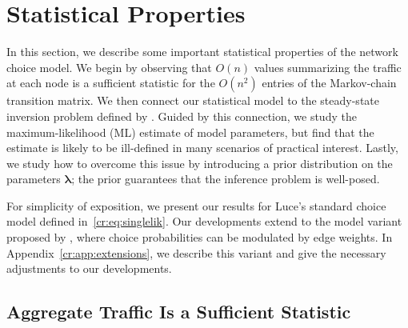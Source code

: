 \section{Statistical Properties}  %
\label{cr:sec:theory}

In this section, we describe some important statistical properties of the network choice model.
We begin by observing that $O(n)$ values summarizing the traffic at each node is a sufficient statistic for the $O(n^2)$ entries of the Markov-chain transition matrix.
We then connect our statistical model to the steady-state inversion problem defined by \citet{kumar2015inverting}.
Guided by this connection, we study the maximum-likelihood (ML) estimate of model parameters, but find that the estimate is likely to be ill-defined in many scenarios of practical interest.
Lastly, we study how to overcome this issue by introducing a prior distribution on the parameters $\bm{\lambda}$; the prior guarantees that the inference problem is well-posed.

For simplicity of exposition, we present our results for Luce's standard choice model defined in~\eqref{cr:eq:singlelik}.
Our developments extend to the model variant proposed by \citet{kumar2015inverting}, where choice probabilities can be modulated by edge weights.
In Appendix~\ref{cr:app:extensions}, we describe this variant and give the necessary adjustments to our developments.

\subsection{Aggregate Traffic Is a Sufficient Statistic}

